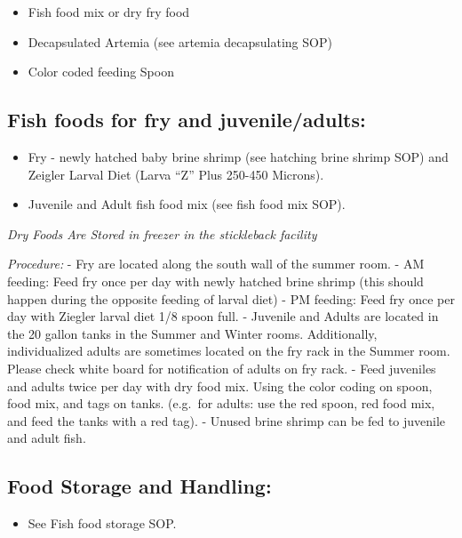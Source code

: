 \documentclass[
]{book}
\providecommand{\tightlist}{%
  \setlength{\itemsep}{0pt}\setlength{\parskip}{0pt}}
\begin{document}
\begin{itemize}
\tightlist
\item
  Fish food mix or dry fry food
\item
  Decapsulated Artemia (see artemia decapsulating SOP)
\item
  Color coded feeding Spoon
\end{itemize}

\hypertarget{fish-foods-for-fry-and-juvenileadults}{%
\subsection{Fish foods for fry and juvenile/adults:}\label{fish-foods-for-fry-and-juvenileadults}}

\begin{itemize}
\tightlist
\item
  Fry - newly hatched baby brine shrimp (see hatching brine shrimp SOP) and Zeigler Larval Diet (Larva ``Z'' Plus 250-450 Microns).
\item
  Juvenile and Adult fish food mix (see fish food mix SOP).
\end{itemize}

\emph{Dry Foods Are Stored in freezer in the stickleback facility}

\emph{Procedure:}
- Fry are located along the south wall of the summer room.
- AM feeding: Feed fry once per day with newly hatched brine shrimp (this should happen during the opposite feeding of larval diet)
- PM feeding: Feed fry once per day with Ziegler larval diet 1/8 spoon full.
- Juvenile and Adults are located in the 20 gallon tanks in the Summer and Winter rooms. Additionally, individualized adults are sometimes located on the fry rack in the Summer room. Please check white board for notification of adults on fry rack.
- Feed juveniles and adults twice per day with dry food mix. Using the color coding on spoon, food mix, and tags on tanks. (e.g.~for adults: use the red spoon, red food mix, and feed the tanks with a red tag).
- Unused brine shrimp can be fed to juvenile and adult fish.

\hypertarget{food-storage-and-handling}{%
\subsection{Food Storage and Handling:}\label{food-storage-and-handling}}

\begin{itemize}
\tightlist
\item
  See Fish food storage SOP.
\end{itemize}
\end{document}
